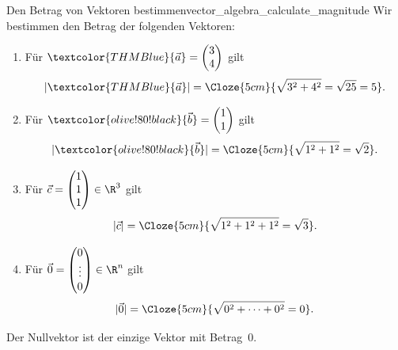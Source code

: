 \begin{ExampleBox}{Den Betrag von Vektoren bestimmen}{vector_algebra_calculate_magnitude}
  Wir bestimmen den Betrag der folgenden Vektoren:\par\smallskip
  \noindent
  \begin{minipage}[c]{0.54\linewidth}
    \begin{enumerate}[label=\alph*),leftmargin=1.7em,itemsep=1em]
      \item Für $\textcolor{THMBlue}{\vec a}=\begin{pmatrix}3\\4\end{pmatrix}$ gilt
        \[
          |\textcolor{THMBlue}{\vec a}|
          =\Cloze{5cm}{\sqrt{3^2+4^2}=\sqrt{25}=5}.
        \]

      \item Für $\textcolor{olive!80!black}{\vec b}=\begin{pmatrix}1\\1\end{pmatrix}$ gilt
        \[
          |\textcolor{olive!80!black}{\vec b}|
          =\Cloze{5cm}{\sqrt{1^2+1^2}=\sqrt2}.
        \]

      \item Für $\vec c=\begin{pmatrix}1\\1\\1\end{pmatrix}\in\R^3$ gilt
        \[
          |\vec c|
          =\Cloze{5cm}{\sqrt{1^2+1^2+1^2}=\sqrt3}.
        \]

      \item Für $\vec 0=\begin{pmatrix}0\\\vdots\\0\end{pmatrix}\in\R^n$ gilt
        \[
          |\vec 0|
          =\Cloze{5cm}{\sqrt{0^2+\dots+0^2}=0}.
        \]
    \end{enumerate}
    Der Nullvektor ist der einzige Vektor mit Betrag~$0$.
  \end{minipage}\hfill
  \begin{minipage}[c]{0.42\linewidth}
    \centering
  \end{minipage}
\end{ExampleBox}

